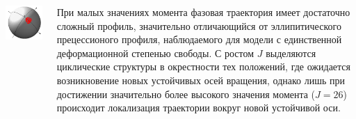 \documentclass[
  14pt,
  a1paper,
  landscape,
  margin=0mm,
  innermargin=15mm,
  blockverticalspace=0mm,
  colspace=0mm,
  subcolspace=0mm
]{tikzposter}
\begin{document}
\begin{columns}
{\begin{tikzfigure}
        \includegraphics[width=0.30\linewidth]{pictures/HarmGroundState00/plot_J=26.png}
    \end{tikzfigure}
    
    \vspace*{-0.5cm}
При малых значениях момента фазовая траектория имеет достаточно сложный профиль, значительно отличающийся от эллипитического прецессионого профиля, наблюдаемого для модели с единственной деформационной степенью свободы. С ростом $J$ выделяются циклические структуры в окрестности тех положений, где ожидается возникновение новых устойчивых осей вращения, однако лишь при достижении значительно более высокого значения момента ($J=26$) происходит локализация траектории вокруг новой устойчивой оси.

}


\end{columns}
\end{document}
